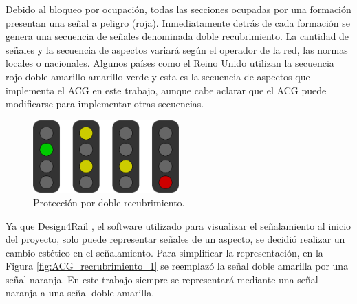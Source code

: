 	Debido al bloqueo por ocupación, todas las secciones ocupadas por una formación presentan una señal a peligro (roja). Inmediatamente detrás de cada formación se genera una secuencia de señales denominada doble recubrimiento. La cantidad de señales y la secuencia de aspectos variará según el operador de la red, las normas locales o nacionales. Algunos países como el Reino Unido \cite{UK} utilizan la secuencia rojo-doble amarillo-amarillo-verde y esta es la secuencia de aspectos que implementa el ACG en este trabajo, aunque cabe aclarar que el ACG puede modificarse para implementar otras secuencias. 
	
	\begin{figure}[!h]
		\centering
		\includegraphics[width=0.5\textwidth]{Figuras/semaforo2}
		\centering\caption{Protección por doble recubrimiento.}
		\label{fig:uk_signalling}
	\end{figure}
	
	Ya que Design4Rail \cite{DESIGN4RAIL}, el software utilizado para visualizar el señalamiento al inicio del proyecto, solo puede representar señales de un aspecto, se decidió realizar un cambio estético en el señalamiento. Para simplificar la representación, en la Figura \ref{fig:ACG_recrubrimiento_1} se reemplazó la señal doble amarilla por una señal naranja. En este trabajo siempre se representará mediante una señal naranja a una señal doble amarilla.

	
	